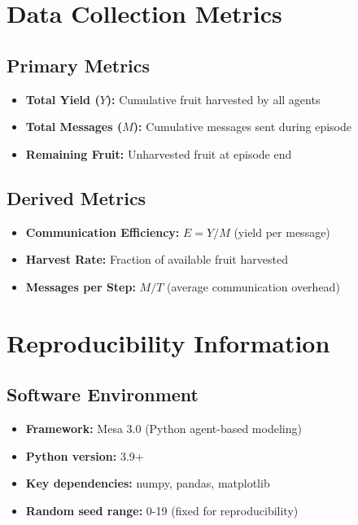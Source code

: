 \section{Data Collection Metrics}

\subsection{Primary Metrics}

\begin{itemize}
    \item \textbf{Total Yield ($Y$):} Cumulative fruit harvested by all agents
    \item \textbf{Total Messages ($M$):} Cumulative messages sent during episode
    \item \textbf{Remaining Fruit:} Unharvested fruit at episode end
\end{itemize}

\subsection{Derived Metrics}

\begin{itemize}
    \item \textbf{Communication Efficiency:} $E = Y / M$ (yield per message)
    \item \textbf{Harvest Rate:} Fraction of available fruit harvested
    \item \textbf{Messages per Step:} $M / T$ (average communication overhead)
\end{itemize}

\section{Reproducibility Information}

\subsection{Software Environment}

\begin{itemize}
    \item \textbf{Framework:} Mesa 3.0 (Python agent-based modeling)
    \item \textbf{Python version:} 3.9+
    \item \textbf{Key dependencies:} numpy, pandas, matplotlib
    \item \textbf{Random seed range:} 0-19 (fixed for reproducibility)
\end{itemize}

